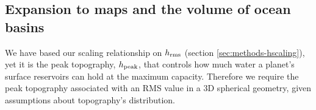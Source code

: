 \documentclass[trackchanges]{aastex63}
\newcommand{\jr}[1]{\textit{\textcolor{blue}{{#1}}}}
\begin{document}





\subsection{Expansion to maps and the volume of ocean basins}



We have based our scaling relationship on $h_{\rm rms}$ (section \ref{sec:methods-hscaling}), yet it is the peak topography, $h_{\rm peak}$, that controls how much water a planet's surface reservoirs can hold at the maximum capacity. Therefore we require the peak topography associated with an RMS value in a 3D spherical geometry, given assumptions about topography's distribution. 
\end{document}
